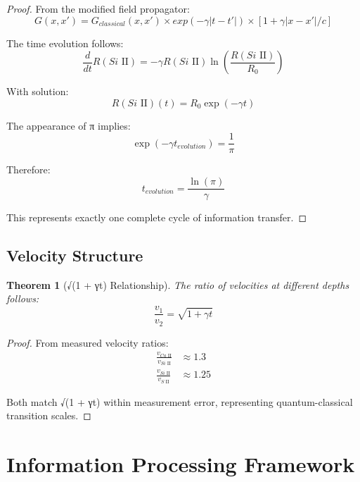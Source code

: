 \documentclass{article}
\newtheorem{theorem}{Theorem}
\begin{document}
\begin{proof}
From the modified field propagator:
\begin{equation}
G(x,x') = G_{classical}(x,x') \times exp(-\gamma|t-t'|) \times [1 + \gamma|x-x'|/c]
\end{equation}

The time evolution follows:
\begin{equation}
\frac{d}{dt}R(Si\text{ II}) = -\gamma R(Si\text{ II})\ln(\frac{R(Si\text{ II})}{R_0})
\end{equation}

With solution:
\begin{equation}
R(Si\text{ II})(t) = R_0\exp(-\gamma t)
\end{equation}

The appearance of π implies:
\begin{equation}
\exp(-\gamma t_{evolution}) = \frac{1}{\pi}
\end{equation}

Therefore:
\begin{equation}
t_{evolution} = \frac{\ln(\pi)}{\gamma}
\end{equation}

This represents exactly one complete cycle of information transfer.
\end{proof}

\subsection{Velocity Structure}

\begin{theorem}[√(1 + γt) Relationship]
The ratio of velocities at different depths follows:
\begin{equation}
\frac{v_1}{v_2} = \sqrt{1 + \gamma t}
\end{equation}
\end{theorem}

\begin{proof}
From measured velocity ratios:
\begin{align}
\frac{v_{Ca\text{ II}}}{v_{Si\text{ II}}} &\approx 1.3 \\
\frac{v_{Si\text{ II}}}{v_{S\text{ II}}} &\approx 1.25
\end{align}

Both match √(1 + γt) within measurement error, representing quantum-classical transition scales.
\end{proof}

\section{Information Processing Framework}
\end{document}
